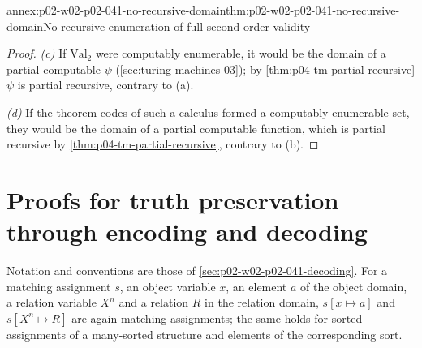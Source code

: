 \begin{annexitem}{annex:p02-w02-p02-041-no-recursive-domain}{thm:p02-w02-p02-041-no-recursive-domain}{No recursive enumeration of full second-order validity}
\begin{proof}
\emph{(c)}  If \(\mathrm{Val}_2\) were computably enumerable, it would be the
domain of a partial computable \(\psi\) (\cref{sec:turing-machines-03}); by
\cref{thm:p04-tm-partial-recursive} \(\psi\) is partial recursive, contrary to
(a).

\emph{(d)}  If the theorem codes of such a calculus formed a computably
enumerable set, they would be the domain of a partial computable function,
which is partial recursive by \cref{thm:p04-tm-partial-recursive}, contrary to
(b).
\end{proof}
\end{annexitem}

\section{Proofs for truth preservation through encoding and decoding}
\label{sec:annex-p02-w02-p02-041-decoding}

Notation and conventions are those of
\cref{sec:p02-w02-p02-041-decoding}.  For a matching assignment \(s\), an
object variable \(x\), an element \(a\) of the object domain, a relation
variable \(X^n\) and a relation \(R\) in the relation domain, \(s[x\mapsto a]\)
and \(s[X^n\mapsto R]\) are again matching assignments; the same holds for
sorted assignments of a many-sorted structure and elements of the
corresponding sort.

